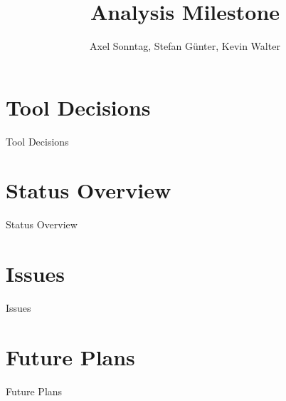 \documentclass[compress,english]{beamer}
\title{Analysis Milestone}
\author{Axel Sonntag, Stefan Günter, Kevin Walter}
\institute{Hochschule Aalen}
\begin{document}
\renewcommand{\theFancyVerbLine}{
  \sffamily\textcolor[rgb]{0.5,0.5,0.5}{\scriptsize\arabic{FancyVerbLine}}}

  

\begin{frame}[plain]
  \titlepage
\end{frame}



\section{Tool Decisions}
\begin{frame}[fragile,c]
\begin{block}{Tool Decisions}
  
\end{block}
\end{frame}


\section{Status Overview}
\begin{frame}[fragile,c]
\begin{block}{Status Overview}
  
\end{block}
\end{frame}

\section{Issues}
\begin{frame}[fragile,c]
\begin{block}{Issues}
  
\end{block}
\end{frame}

\section{Future Plans}
\begin{frame}[fragile,c]
\begin{block}{Future Plans}
  
\end{block}
\end{frame}
\end{document}

